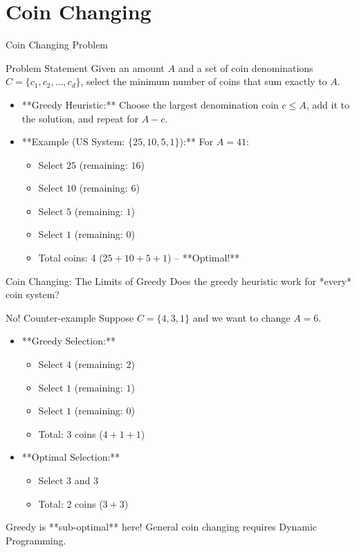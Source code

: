 \documentclass[aspectratio=169,xcolor=dvipsnames]{beamer}
\begin{document}
\section{Coin Changing}

\begin{frame}{Coin Changing Problem}
  \begin{block}{Problem Statement}
    Given an amount $A$ and a set of coin denominations $C = \{c_1, c_2, \ldots, c_d\}$, select the minimum number of coins that sum exactly to $A$.
  \end{block}
  \begin{itemize}
    \item **Greedy Heuristic:** Choose the largest denomination coin $c \le A$, add it to the solution, and repeat for $A - c$.
    \item **Example (US System: $\{25, 10, 5, 1\}$):** For $A = 41$:
      \begin{itemize}
        \item Select $25$ (remaining: $16$)
        \item Select $10$ (remaining: $6$)
        \item Select $5$ (remaining: $1$)
        \item Select $1$ (remaining: $0$)
        \item Total coins: 4 ($25 + 10 + 5 + 1$) -- **Optimal!**
      \end{itemize}
  \end{itemize}
\end{frame}

\begin{frame}{Coin Changing: The Limits of Greedy}
  Does the greedy heuristic work for *every* coin system?
  \begin{alertblock}{No! Counter-example}
    Suppose $C = \{4, 3, 1\}$ and we want to change $A = 6$.
    \begin{itemize}
      \item **Greedy Selection:**
        \begin{itemize}
          \item Select $4$ (remaining: $2$)
          \item Select $1$ (remaining: $1$)
          \item Select $1$ (remaining: $0$)
          \item Total: 3 coins ($4 + 1 + 1$)
        \end{itemize}
      \item **Optimal Selection:**
        \begin{itemize}
          \item Select $3$ and $3$
          \item Total: 2 coins ($3 + 3$)
        \end{itemize}
    \end{itemize}
    Greedy is **sub-optimal** here! General coin changing requires Dynamic Programming.
  \end{alertblock}
\end{frame}
\end{document}

